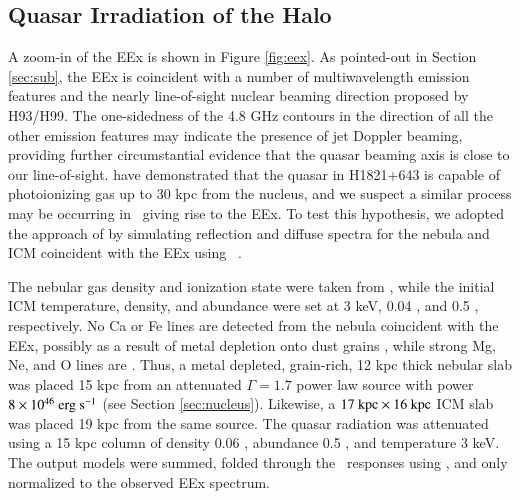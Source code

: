 \documentclass[referee,traditabstract]{aa}
\begin{document}
\subsection{Quasar Irradiation of the Halo}

A zoom-in of the EEx is shown in Figure \ref{fig:eex}. As pointed-out
in Section \ref{sec:sub}, the EEx is coincident with a number of
multiwavelength emission features and the nearly line-of-sight nuclear
beaming direction proposed by H93/H99. The one-sidedness of the 4.8
GHz contours in the direction of all the other emission features may
indicate the presence of jet Doppler beaming, providing further
circumstantial evidence that the quasar beaming axis is close to our
line-of-sight. \citet{2010MNRAS.402.1561R} have demonstrated that the
quasar in H1821+643 is capable of photoionizing gas up to 30 kpc from
the nucleus, and we suspect a similar process may be occurring in
\irs\ giving rise to the EEx. To test this hypothesis, we adopted the
approach of \citet{2010MNRAS.402.1561R} by simulating reflection and
diffuse spectra for the nebula and ICM coincident with the EEx using
\cloudy\ \citep{cloudy}.

The nebular gas density and ionization state were taken from
\citet{2000AJ....120..562T}, while the initial ICM temperature,
density, and abundance were set at 3 keV, 0.04 \pcc, and 0.5 \Zsol,
respectively. No Ca or Fe lines are detected from the nebula
coincident with the EEx, possibly as a result of metal depletion onto
dust grains \citep[\eg][]{1993ApJ...414L..17D}, while strong Mg, Ne,
and O lines are \citep{2000AJ....120..562T}. Thus, a metal depleted,
grain-rich, 12 kpc thick nebular slab was placed 15 kpc from an
attenuated $\Gamma = 1.7$ power law source with power $8 \times
10^{46} ~\rm{\mbox{\ensuremath{\rm{erg}}}~\ensuremath{\rm{\mbox{\ensuremath{\rm{s}}}^{-1}}}}$ (see Section \ref{sec:nucleus}). Likewise, a $17 ~\mbox{\ensuremath{\rm{kpc}}}
\times 16 ~\mbox{\ensuremath{\rm{kpc}}}$ ICM slab was placed 19 kpc from the same source. The
quasar radiation was attenuated using a 15 kpc column of density 0.06
\pcc, abundance 0.5 \Zsol, and temperature 3 keV. The output models
were summed, folded through the \cxo\ responses using \xspec, and only
normalized to the observed EEx spectrum.
\end{document}
